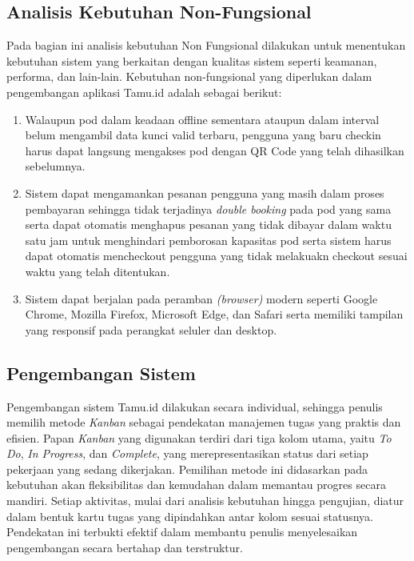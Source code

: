 \subsection{Analisis Kebutuhan Non-Fungsional}

Pada bagian ini analisis kebutuhan Non Fungsional dilakukan untuk menentukan kebutuhan sistem yang berkaitan dengan kualitas sistem seperti keamanan, performa, dan lain-lain. Kebutuhan non-fungsional yang diperlukan dalam pengembangan aplikasi Tamu.id adalah sebagai berikut:
\begin{enumerate}
    \item Walaupun pod dalam keadaan offline sementara ataupun dalam interval belum mengambil data kunci valid terbaru, pengguna yang baru checkin harus dapat langsung mengakses pod dengan QR Code yang telah dihasilkan sebelumnya.
    \item Sistem dapat mengamankan pesanan pengguna yang masih dalam proses pembayaran sehingga tidak terjadinya \textit{double booking} pada pod yang sama serta dapat otomatis menghapus pesanan yang tidak dibayar dalam waktu satu jam untuk menghindari pemborosan kapasitas pod serta sistem harus dapat otomatis mencheckout pengguna yang tidak melakuakn checkout sesuai waktu yang telah ditentukan.
    \item Sistem dapat berjalan pada peramban \textit{(browser)} modern seperti Google Chrome, Mozilla Firefox, Microsoft Edge, dan Safari serta memiliki tampilan yang responsif pada perangkat seluler dan desktop.
\end{enumerate}

\subsection{Pengembangan Sistem}

Pengembangan sistem Tamu.id dilakukan secara individual, sehingga penulis memilih metode \textit{Kanban} sebagai pendekatan manajemen tugas yang praktis dan efisien. Papan \textit{Kanban} yang digunakan terdiri dari tiga kolom utama, yaitu \textit{To Do}, \textit{In Progress}, dan \textit{Complete}, yang merepresentasikan status dari setiap pekerjaan yang sedang dikerjakan. Pemilihan metode ini didasarkan pada kebutuhan akan fleksibilitas dan kemudahan dalam memantau progres secara mandiri. Setiap aktivitas, mulai dari analisis kebutuhan hingga pengujian, diatur dalam bentuk kartu tugas yang dipindahkan antar kolom sesuai statusnya. Pendekatan ini terbukti efektif dalam membantu penulis menyelesaikan pengembangan secara bertahap dan terstruktur.

